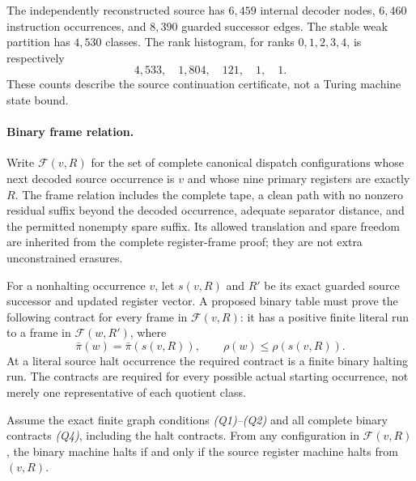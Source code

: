 The independently reconstructed source has \(6{,}459\) internal decoder
nodes, \(6{,}460\) instruction occurrences, and \(8{,}390\) guarded successor
edges. The stable weak partition has \(4{,}530\) classes. The rank
histogram, for ranks \(0,1,2,3,4\), is respectively
\[
  4{,}533,\quad1{,}804,\quad121,\quad1,\quad1.
\]
These counts describe the source continuation certificate, not a Turing
machine state bound.

\paragraph{Binary frame relation.}
Write \(\mathcal F(v,R)\) for the set of complete canonical dispatch
configurations whose next decoded source occurrence is \(v\) and whose nine
primary registers are exactly \(R\). The frame relation includes the
complete tape, a clean path with no nonzero residual suffix beyond the
decoded occurrence, adequate separator distance, and the permitted nonempty
spare suffix. Its allowed translation and spare freedom are inherited
from the complete register-frame proof; they are not extra unconstrained
erasures.

For a nonhalting occurrence \(v\), let \(s(v,R)\) and \(R'\) be its exact
guarded source successor and updated register vector. A proposed binary
table must prove the following contract for every frame in
\(\mathcal F(v,R)\): it has a positive finite literal run to a frame in
\(\mathcal F(w,R')\), where
\[
 \bar\pi(w)=\bar\pi(s(v,R)),\qquad
 \rho(w)\leq \rho(s(v,R)).
 \tag{Q4}
\]
At a literal source halt occurrence the required contract is a finite
binary halting run. The contracts are required for every possible actual
starting occurrence, not merely one representative of each quotient class.

\begin{theorem}
Assume the exact finite graph conditions \emph{(Q1)--(Q2)} and all complete
binary contracts \emph{(Q4)}, including the halt contracts. From any
configuration in \(\mathcal F(v,R)\), the binary machine halts if and only if
the source register machine halts from \((v,R)\).
\end{theorem}

